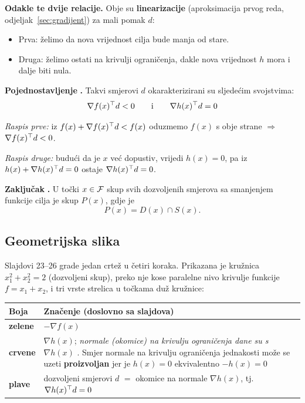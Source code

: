 \textbf{Odakle te dvije relacije.} Obje su \textbf{linearizacije}
(aproksimacija prvog reda, odjeljak~\ref{sec:gradijent}) za mali pomak $d$:

\begin{itemize}
  \item Prva: želimo da nova vrijednost cilja bude manja od stare.
  \item Druga: želimo ostati na krivulji ograničenja, dakle nova vrijednost
        $h$ mora i dalje biti nula.
\end{itemize}

\textbf{Pojednostavljenje} \textbf{.} Takvi smjerovi $d$
okarakterizirani su sljedećim svojstvima:
\[
\nabla f(x)^{\top} d < 0 \qquad\text{i}\qquad \nabla h(x)^{\top} d = 0
\]

\emph{Raspis prve:} iz $f(x) + \nabla f(x)^{\top} d < f(x)$ oduzmemo $f(x)$ s obje
strane $\Rightarrow$ $\nabla f(x)^{\top} d < 0$.

\emph{Raspis druge:} budući da je $x$ već dopustiv, vrijedi $h(x) = 0$, pa iz
$h(x) + \nabla h(x)^{\top} d = 0$ ostaje $\nabla h(x)^{\top} d = 0$.

\textbf{Zaključak} \textbf{.} U točki $x \in \mathcal{F}$ skup svih
dozvoljenih smjerova sa smanjenjem funkcije cilja je skup $P(x)$, gdje je
\[
P(x) = D(x) \cap S(x).
\]

\subsection{Geometrijska slika}

Slajdovi 23--26 grade jedan crtež u četiri koraka. Prikazana je kružnica
$x_1^2+x_2^2 = 2$ (dozvoljeni skup), preko nje kose paralelne nivo krivulje
funkcije $f = x_1+x_2$, i tri vrste strelica u točkama duž kružnice:

\begin{center}
\begin{tabular}{P{2.4cm}P{10.6cm}}
\toprule
\textbf{Boja} & \textbf{Značenje (doslovno sa slajdova)} \\
\midrule
\textcolor{zelena}{\textbf{zelene}} & $-\nabla f(x)$  \\
\textcolor{fsbcrvena}{\textbf{crvene}} & $\nabla h(x)$; \emph{normale (okomice)
  na krivulju ograničenja dane su s $\nabla h(x)$} . Smjer normale na
  krivulju ograničenja jednakosti može se uzeti \textbf{proizvoljan} jer je
  $h(x) = 0$ ekvivalentno $-h(x) = 0$  \\
\textcolor{tamnoplava}{\textbf{plave}} & dozvoljeni smjerovi $d$ $=$ okomice na
  normale $\nabla h(x)$, tj.\ $\nabla h(x)^{\top} d = 0$  \\
\bottomrule
\end{tabular}
\end{center}

